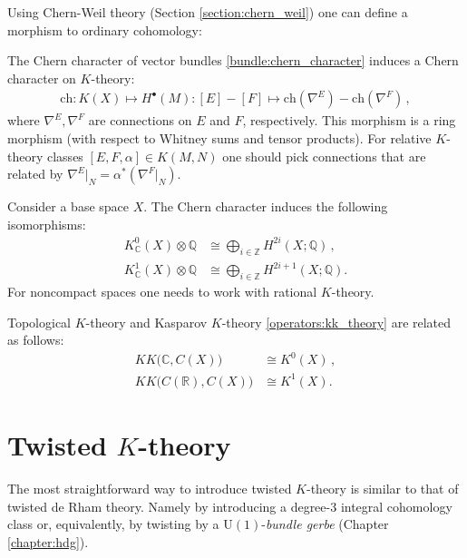 {    Using Chern-Weil theory (Section \ref{section:chern_weil}) one can define a morphism to ordinary cohomology:
    \begin{construct}\label{k:chern_character}
        The Chern character of vector bundles \ref{bundle:chern_character} induces a Chern character on $K$-theory:
        \begin{gather}
            \mathrm{ch}:K(X)\mapsto H^\bullet(M):[E]-[F]\mapsto \mathrm{ch}(\nabla^E)-\mathrm{ch}(\nabla^F)\,,
        \end{gather}
        where $\nabla^E,\nabla^F$ are connections on $E$ and $F$, respectively. This morphism is a ring morphism (with respect to Whitney sums and tensor products). For relative $K$-theory classes $[E,F,\alpha]\in K(M,N)$ one should pick connections that are related by $\nabla^E|_N=\alpha^*(\nabla^F|_N)$.
    \end{construct}
    \begin{theorem}
        Consider a base space $X$. The Chern character induces the following isomorphisms:
        \begin{align}
            K^0_\mathbb{C}(X)\otimes\mathbb{Q}&\cong\bigoplus_{i\in\mathbb{Z}}H^{2i}(X;\mathbb{Q})\,,\\
            K^1_\mathbb{C}(X)\otimes\mathbb{Q}&\cong\bigoplus_{i\in\mathbb{Z}}H^{2i+1}(X;\mathbb{Q}).
        \end{align}
        For noncompact spaces one needs to work with rational $K$-theory.
    \end{theorem}

    \begin{property}[$K\!K$-theory]\label{k:topological_kk_theory}
        Topological $K$-theory and Kasparov $K$-theory \ref{operators:kk_theory} are related as follows:
        \begin{align}
            K\!K\big(\mathbb{C},C(X)\big)&\cong K^0(X)\,,\\
            K\!K\big(C(\mathbb{R}),C(X)\big)&\cong K^1(X).
        \end{align}
    \end{property}

\section{\texorpdfstring{Twisted $K$-theory}{Twisted K-theory}}

    The most straightforward way to introduce twisted $K$-theory is similar to that of twisted de Rham theory. Namely by introducing a degree-3 integral cohomology class or, equivalently, by twisting by a $\mathrm{U}(1)$-\textit{bundle gerbe} (Chapter \ref{chapter:hdg}).

}
